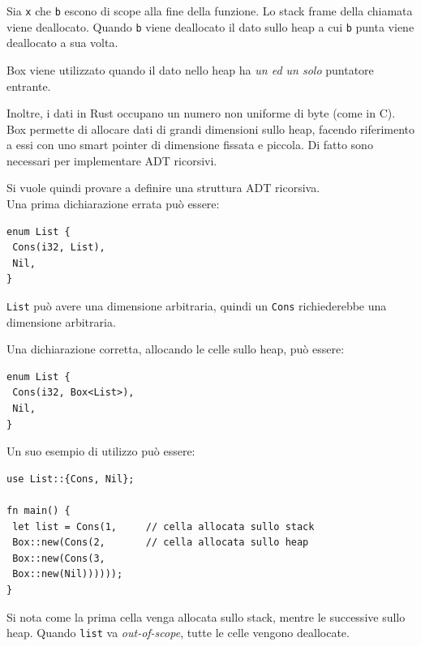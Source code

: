 \documentclass{article}
\begin{document}
Sia \texttt{x} che \texttt{b} escono di scope alla fine della funzione. Lo stack frame della chiamata viene deallocato. Quando \texttt{b} viene deallocato il dato sullo heap a cui \texttt{b} punta viene deallocato a sua volta.

Box viene utilizzato quando il dato nello heap ha \textit{un ed un solo} puntatore entrante.

Inoltre, i dati in Rust occupano un numero non uniforme di byte (come in C). Box permette di allocare dati di grandi dimensioni sullo heap, facendo riferimento a essi con uno smart pointer di dimensione fissata e piccola. Di fatto sono necessari per implementare ADT ricorsivi.

Si vuole quindi provare a definire una struttura ADT ricorsiva.\\
Una prima dichiarazione errata può essere:
\begin{tcolorbox}
\begin{verbatim}
enum List {
 Cons(i32, List),
 Nil,
}
\end{verbatim}
\end{tcolorbox}
\texttt{List} può avere una dimensione arbitraria, quindi un \texttt{Cons} richiederebbe una dimensione arbitraria.

Una dichiarazione corretta, allocando le celle sullo heap, può essere:
\begin{tcolorbox}
\begin{verbatim}
enum List {
 Cons(i32, Box<List>),
 Nil,
}
\end{verbatim}
\end{tcolorbox}
Un suo esempio di utilizzo può essere:
\begin{tcolorbox}
\begin{verbatim}
use List::{Cons, Nil};

fn main() {
 let list = Cons(1,     // cella allocata sullo stack
 Box::new(Cons(2,       // cella allocata sullo heap
 Box::new(Cons(3,
 Box::new(Nil))))));
}
\end{verbatim}
\end{tcolorbox}
Si nota come la prima cella venga allocata sullo stack, mentre le successive sullo heap. Quando \texttt{list} va \textit{out-of-scope}, tutte le celle vengono deallocate.
\end{document}
